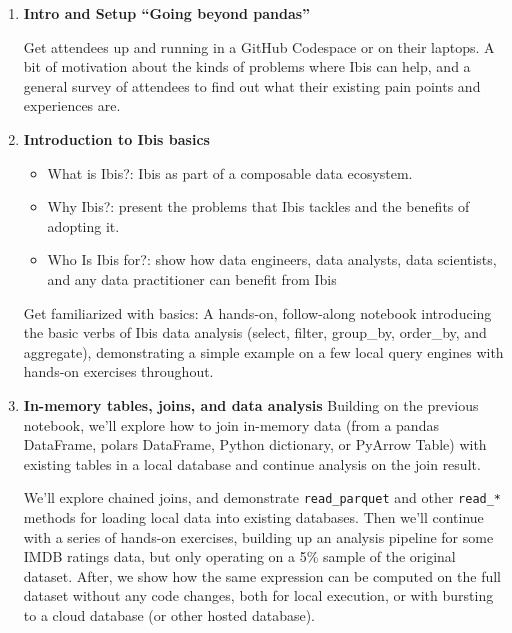 \documentclass[sigconf]{acmart}
\begin{document}
\begin{enumerate}
\item \textbf{Intro and Setup “Going beyond pandas”}
\vspace{2pt}

Get attendees up and running in a GitHub Codespace or on their laptops. A bit of
motivation about the kinds of problems where Ibis can help, and a general survey 
of attendees to find out what their existing pain points and experiences are.\\

\item \textbf{Introduction to Ibis basics}
\vspace{2pt}
\begin{itemize}
    \item What is Ibis?: Ibis as part of a composable data ecosystem.
    \item Why Ibis?: present the problems that Ibis tackles and the benefits of adopting it.
    \item Who Is Ibis for?: show how data engineers, data analysts, data scientists, and any data practitioner can benefit from Ibis
\end{itemize}
\vspace{2pt}
Get familiarized with basics: A hands-on, follow-along notebook introducing the basic 
verbs of Ibis data analysis (select, filter, group\_by, order\_by, and aggregate), demonstrating 
a simple example on a few local query engines with hands-on exercises throughout.\\

\item \textbf{In-memory tables, joins, and data analysis}
\vspace{2pt}
Building on the previous notebook, we'll explore how to join in-memory data (from 
a pandas DataFrame, polars DataFrame, Python dictionary, or PyArrow Table) with
existing tables in  a local database and continue analysis on the join result.

We'll explore chained joins, and demonstrate \texttt{read\_parquet} and other \texttt{read\_*} methods
for loading local data into existing databases. Then we'll continue with a series 
of hands-on exercises, building up an analysis pipeline for some IMDB ratings data,
but only operating on a 5\% sample of the original dataset. After, we show how the 
same expression can be computed on the full dataset without any code changes, both 
for local execution, or with bursting to a cloud database (or other hosted database).\\


\end{enumerate}
\end{document}
